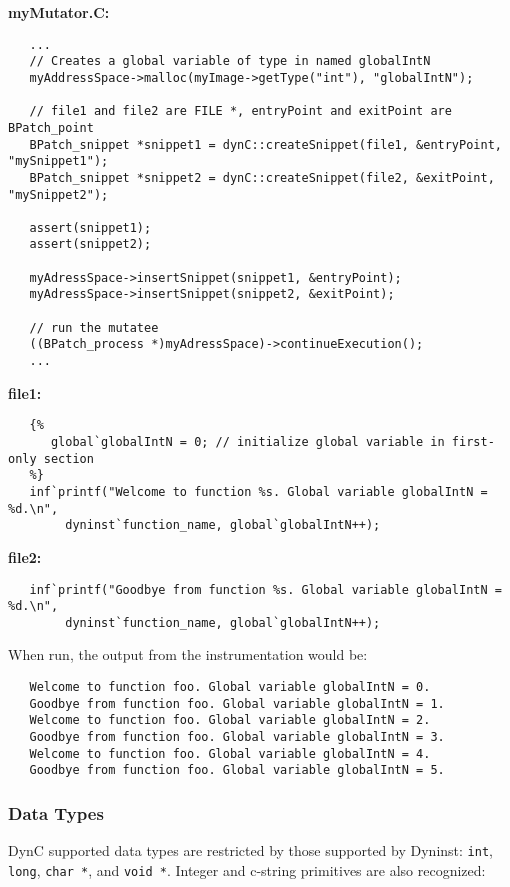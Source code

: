 \documentclass{article}
\begin{document}
\noindent \textbf{myMutator.C:}
\begin{lstlisting}
   ...
   // Creates a global variable of type in named globalIntN
   myAddressSpace->malloc(myImage->getType("int"), "globalIntN"); 
   
   // file1 and file2 are FILE *, entryPoint and exitPoint are BPatch_point 
   BPatch_snippet *snippet1 = dynC::createSnippet(file1, &entryPoint, "mySnippet1"); 
   BPatch_snippet *snippet2 = dynC::createSnippet(file2, &exitPoint, "mySnippet2");
   
   assert(snippet1);
   assert(snippet2);
   
   myAdressSpace->insertSnippet(snippet1, &entryPoint);
   myAdressSpace->insertSnippet(snippet2, &exitPoint);
   
   // run the mutatee
   ((BPatch_process *)myAdressSpace)->continueExecution();
   ...
\end{lstlisting}
\noindent \textbf{file1:}
\begin{lstlisting}
   {%
      global`globalIntN = 0; // initialize global variable in first-only section
   %}
   inf`printf("Welcome to function %s. Global variable globalIntN = %d.\n", 
        dyninst`function_name, global`globalIntN++);
\end{lstlisting}

\noindent \textbf{file2:}
\begin{lstlisting}
   inf`printf("Goodbye from function %s. Global variable globalIntN = %d.\n", 
        dyninst`function_name, global`globalIntN++);
\end{lstlisting}

\noindent When run, the output from the instrumentation would be:
\begin{lstlisting}
   Welcome to function foo. Global variable globalIntN = 0.
   Goodbye from function foo. Global variable globalIntN = 1.
   Welcome to function foo. Global variable globalIntN = 2.
   Goodbye from function foo. Global variable globalIntN = 3.
   Welcome to function foo. Global variable globalIntN = 4.
   Goodbye from function foo. Global variable globalIntN = 5.
\end{lstlisting}

\subsubsection{Data Types}
\label{dataTypes}
DynC supported data types are restricted by those supported by Dyninst: \verb!int!, \verb!long!, \verb!char *!, and \verb!void *!. Integer and c-string primitives are also recognized:\\
\end{document}
